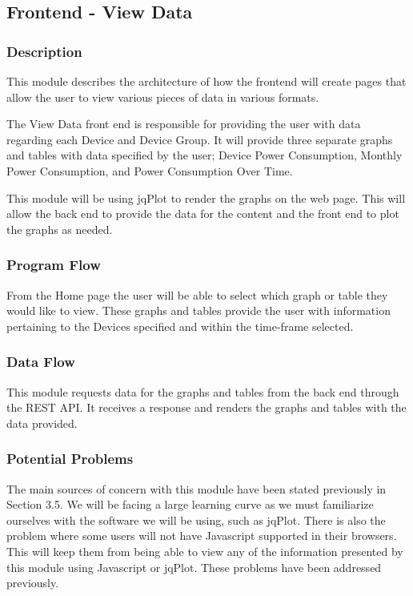 
\subsection{Frontend - View Data}

\subsubsection{Description}

This module describes the architecture of how the frontend will create pages that allow the user to view various pieces of data in various formats.

The View Data front end is responsible for providing the user with data regarding each Device and Device Group. 
It will provide three separate graphs and tables with data specified by the user; 
Device Power Consumption, Monthly Power Consumption, and Power Consumption Over Time. 

This module will be using jqPlot to render the graphs on the web page. 
This will allow the back end to provide the data for the content and the front end to plot the graphs as needed. 


\subsubsection{Program Flow}

From the Home page the user will be able to select which graph or table they would like to view.  
These graphs and tables provide the user with information pertaining to the Devices specified and within the time-frame selected.  

\subsubsection{Data Flow}

This module requests data for the graphs and tables from the back end through the REST API. 
It receives a response and renders the graphs and tables with the data provided. 

\subsubsection{Potential Problems}

The main sources of concern with this module have been stated previously in Section 3.5. 
We will be facing a large learning curve as we must familiarize ourselves with the software we will be using, such as jqPlot. 
There is also the problem where some users will not have Javascript supported in their browsers. 
This will keep them from being able to view any of the information presented by this module using Javascript or jqPlot. 
These problems have been addressed previously. 


